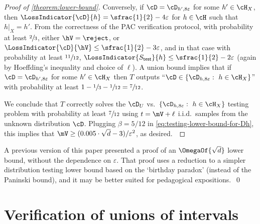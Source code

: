 \begin{proof}[Proof of \cref{theorem:lower-bound}]
	Conversely, if $\cD = \cD_{h',8\varepsilon}$ for some $h' \in \cH_X$,
	then $\LossIndicator{\cD}{h} = \sfrac{1}{2}-4\varepsilon$ for $h \in \cH$ such that $h|_X = h'$. From the correctness of the PAC verification protocol, with probability at least $\sfrac{2}{3}$, either $\hV = \reject$, or $\LossIndicator{\cD}{\hV} \leq \sfrac{1}{2}-3\varepsilon$, and in that case with probability at least $\sfrac{11}{12}$, $\LossIndicator{S_{\mathsf{test}}}{h} \leq \sfrac{1}{2}-2\varepsilon$  (again by Hoeffding's inequality and choice of $\ell$). A union bound implies that if $\cD = \cD_{h',8\varepsilon}$ for some $h' \in \cH_X$ then $T$ outputs ``$\cD \in \{\cD_{h,8\varepsilon} : ~ h \in \cH_X\}$'' with probability at least $1 - \sfrac{1}{3} - \sfrac{1}{12} = \sfrac{7}{12}$.

	We conclude that $T$ correctly solves the $\cD_U$ vs.\ $\{\cD_{h,8\varepsilon}: ~ h \in \cH_X\}$ testing problem with probability at least $\sfrac{7}{12}$ using $t = \mV + \ell$ i.i.d.\ samples from the unknown distribution $\cD$. Plugging $\beta=5/12$ in \cref{eq:testing-lower-bound-for-Dh}, this implies that $\mV \geq (0.005 \cdot \sqrt{d}-3)/\varepsilon^2$, as desired.~\qedhere
\end{proof}

\begin{remark}
	A previous version of this paper \cite{older-arxiv-version} presented a proof of an $\OmegaOf{\sqrt{d}}$ lower bound, without the dependence on $\varepsilon$. That proof uses a reduction to a simpler distribution testing lower bound based on the `birthday paradox' (instead of the Paninski bound), and it may be better suited for pedagogical expositions.~\qed
\end{remark}

\section{Verification of unions of intervals}
\label{section:verification-union-of-intervals}


